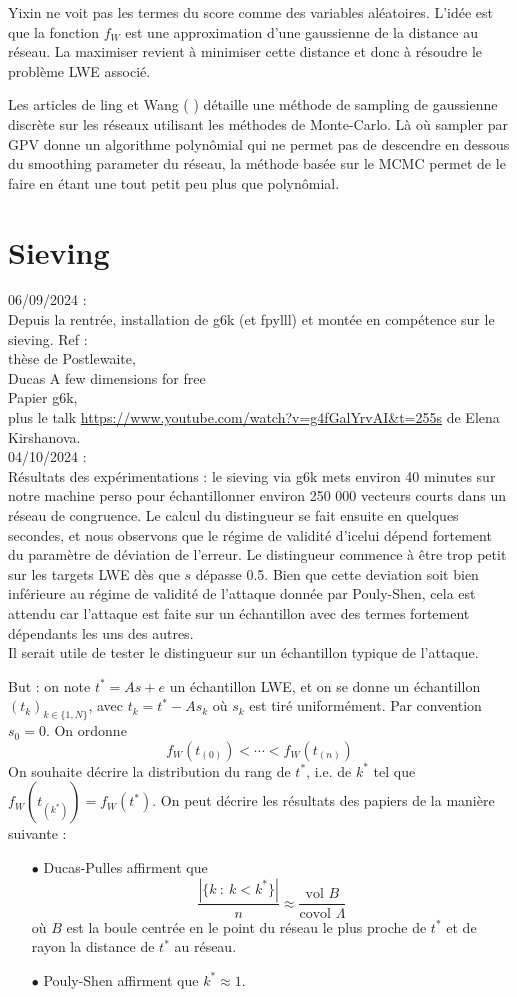 \documentclass{article}
\begin{document}
Yixin ne voit pas les termes du score comme des variables aléatoires. L'idée est que la fonction $f_W$ est une approximation d'une gaussienne de la distance au réseau. La maximiser revient à minimiser cette distance et donc à résoudre le problème LWE associé.
 
Les articles de ling et Wang (\cite{wang2017geometric} \cite{wang2019lattice}) détaille une méthode de sampling de gaussienne discrète sur les réseaux utilisant les méthodes de Monte-Carlo. Là où sampler par GPV donne un algorithme polynômial qui ne permet pas de descendre en dessous du smoothing parameter du réseau, la méthode basée sur le MCMC permet de le faire en étant une tout petit peu plus que polynômial.
 
\section{Sieving}
 
06/09/2024 : \\
Depuis la rentrée, installation de g6k (et fpylll) et montée en compétence sur le sieving. 
Ref : \\
thèse de Postlewaite, \\
Ducas A few dimensions for free\\
Papier g6k, \\
plus le talk \url{https://www.youtube.com/watch?v=g4fGalYrvAI&t=255s} de Elena Kirshanova.\\

04/10/2024 :\\
Résultats des expérimentations : le sieving via g6k mets environ 40 minutes sur notre machine perso pour échantillonner environ 250 000 vecteurs courts dans un réseau de congruence. Le calcul du distingueur se fait ensuite en quelques secondes, et nous observons que le régime de validité d'icelui dépend fortement du paramètre de déviation de l'erreur. Le distingueur commence à être trop petit sur les targets LWE dès que $s$ dépasse 0.5. Bien que cette deviation soit bien inférieure au régime de validité de l'attaque donnée par Pouly-Shen, cela est attendu car l'attaque est faite sur un échantillon avec des termes fortement dépendants les uns des autres.\\

Il serait utile de tester le distingueur sur un échantillon typique de l'attaque. 

But : on note $t^* = As+e$ un échantillon LWE, et on se donne un échantillon $(t_k)_{k\in\{1,N\}}$, avec $t_k = t^* - A s_k$ où $s_k$ est tiré uniformément. Par convention $s_0=0$. On ordonne 
\[ f_W(t_{(0)})<\cdots < f_W(t_{(n)}) \]
On souhaite décrire la distribution du rang de $t^*$, i.e. de $k^*$ tel que $f_W(t_{(k^*)}) = f_W(t^*)$.
On peut décrire les résultats des papiers de la manière suivante :
\begin{itemize}
\item[$\bullet$] Ducas-Pulles affirment que 
\[\frac{|\{k \ : \ k < k^* \}|}{n} \approx \frac{\text{vol }B}{\text{covol }\Lambda}\]
où $B$ est la boule centrée en le point du réseau le plus proche de $t^*$ et de rayon la distance de $t^*$ au réseau.
\item[$\bullet$] Pouly-Shen affirment que $k^*\approx 1$.
\end{itemize}
\end{document}

